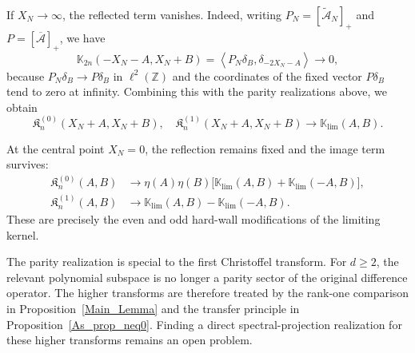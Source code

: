 \documentclass[reqno,11pt]{amsart}
\newcommand{\ZZ}{\mathbb{Z}}
\theoremstyle{plain}
\theoremstyle{definition}
\numberwithin{equation}{section}
\begin{document}
If $X_N\to\infty$, the reflected term vanishes. Indeed, writing $P_N=[\widetilde{\mathcal{A}}_N]_+$ and $P=[\overline{\mathcal{A}}]_+$, we have
\[
\mathbb K_{2n}(-X_N-A,X_N+B) =
\left\langle
P_N\delta_B,\delta_{-2X_N-A}
\right\rangle
\longrightarrow0,
\]
because $P_N\delta_B\to P\delta_B$ in $\ell^2(\ZZ)$ and the coordinates of the fixed vector $P\delta_B$ tend to zero at infinity. Combining this with the parity realizations above, we obtain
\[
\mathfrak K_n^{(0)}(X_N+A,X_N+B),
\quad
\mathfrak K_n^{(1)}(X_N+A,X_N+B)
\longrightarrow
\mathbb K_{\lim}(A,B).
\]

At the central point $X_N=0$, the reflection remains fixed and the image term survives:
\[
\begin{aligned}
\mathfrak K_n^{(0)}(A,B)
&\longrightarrow
\eta(A)\eta(B)
\bigl[
\mathbb K_{\lim}(A,B) +
\mathbb K_{\lim}(-A,B)
\bigr],\\
\mathfrak K_n^{(1)}(A,B)
&\longrightarrow
\mathbb K_{\lim}(A,B) -
\mathbb K_{\lim}(-A,B).
\end{aligned}
\]
These are precisely the even and odd hard-wall modifications of the limiting kernel.

The parity realization is special to the first Christoffel transform. For $d\geq2$, the relevant polynomial subspace is no longer a parity sector of the original difference operator. The higher transforms are therefore treated by the rank-one comparison in Proposition~\ref{Main_Lemma} and the transfer principle in Proposition~\ref{As_prop_neq0}. Finding a direct spectral-projection realization for these higher transforms remains an open problem.



\end{document}
